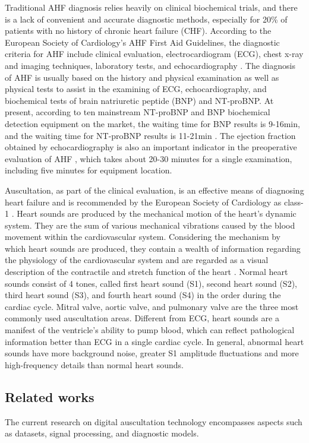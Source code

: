 Traditional AHF diagnosis relies heavily on clinical biochemical trials, and there is a lack of convenient and accurate diagnostic methods, especially for 20\% of patients with no history of chronic heart failure (CHF). According to the European Society of Cardiology's AHF First Aid Guidelines, the diagnostic criteria for AHF include clinical evaluation, electrocardiogram (ECG), chest x-ray and imaging techniques, laboratory tests, and echocardiography \cite{nieminen2005task}. The diagnosis of AHF is usually based on the history and physical examination as well as physical tests to assist in the examining of ECG, echocardiography, and biochemical tests of brain natriuretic peptide (BNP) and NT-proBNP. At present, according to ten mainstream NT-proBNP and BNP biochemical detection equipment on the market, the waiting time for BNP results is 9-16min, and the waiting time for NT-proBNP results is 11-21min \cite{lewis2020bnp}. The ejection fraction obtained by echocardiography is also an important indicator in the preoperative evaluation of AHF \cite{menon2022echocardiography}, which takes about 20-30 minutes for a single examination, including five minutes for equipment location.

Auscultation, as part of the clinical evaluation, is an effective means of diagnosing heart failure and is recommended by the European Society of Cardiology as class-1 \cite{nieminen2005task}. Heart sounds are produced by the mechanical motion of the heart's dynamic system. They are the sum of various mechanical vibrations caused by the blood movement within the cardiovascular system. Considering the mechanism by which heart sounds are produced, they contain a wealth of information regarding the physiology of the cardiovascular system and are regarded as a visual description of the contractile and stretch function of the heart \cite{johnston2007third,wynne2001clinical,boorsma2020congestion}. Normal heart sounds consist of 4 tones, called first heart sound (S1), second heart sound (S2), third heart sound (S3), and fourth heart sound (S4) in the order during the cardiac cycle. Mitral valve, aortic valve, and pulmonary valve are the three most commonly used auscultation areas. Different from ECG, heart sounds are a manifest of the ventricle's ability to pump blood, which can reflect pathological information better than ECG in a single cardiac cycle. In general, abnormal heart sounds have more background noise, greater S1 amplitude fluctuations and more high-frequency details than normal heart sounds. 
\subsection{Related works}
The current research on digital auscultation technology encompasses aspects such as datasets, signal processing, and diagnostic models.

